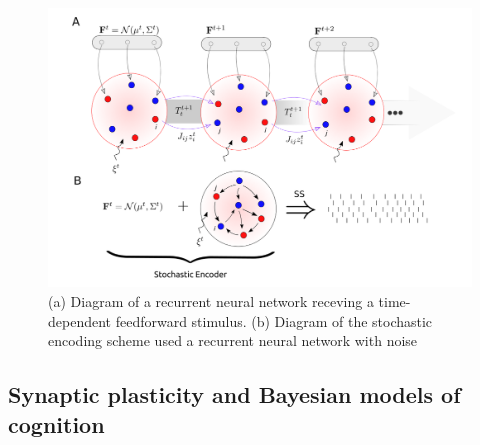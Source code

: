 \documentclass{ucetd}
\begin{document}
\begin{figure}[t!]
\centering
\includegraphics[width=150mm]{figure-1}
\caption{(a) Diagram of a recurrent neural network receving a time-dependent feedforward stimulus. (b) Diagram of the stochastic encoding scheme used a recurrent neural network with noise}
\end{figure}


\subsection{Synaptic plasticity and Bayesian models of cognition}
\end{document}
